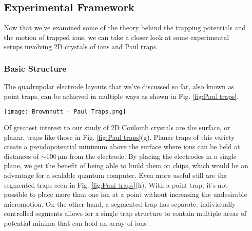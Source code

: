 \subsection{Experimental Framework}
Now that we've examined some of the theory behind the trapping potentials and the motion of trapped ions, we can take a closer look at some experimental setups involving 2D crystals of ions and Paul traps. 
\subsubsection{Basic Structure}
The quadrupolar electrode layouts that we've discussed so far, also known as point traps, can be achieved in multiple ways as shown in Fig. \ref{fig:Paul traps}.
\begin{figure*}[t]
    \centering
    \texttt{[image: Brownnutt - Paul Traps.png]}
    \caption{Several possible trap configurations are seen here. (\textbf{a}) In the simplist case, a set of four perfectly hyperbolic electrodes create a perfectly quadrupolar field. (\textbf{b}) This is a basic ring trap. It has rotational symmetry and an create a pseudopotential capable of confining ions in three dimensions. (\textbf{c}) This is translationally symmetric and forms the basis for a linear trap. (\textbf{d}), (\textbf{e}) These are both topologically equivalent to the ring trap in (b). (\textbf{f}) This is topologically equivalent to the linear trap in (c) but with additional endcap electrodes making it a four-rod linear trap. (\textbf{g}) The four-rod trap in (f) can be reconstructed so that the electrodes are flattened into a single plane. This forms a linear "surface-electrode" trap. (\textbf{h}) A linear trap similar to (g) except the electrodes have been segmented to allow for multiple trapping zones. Figure borrowed from \textit{Ion-trap measurements of electric-field noise near surfaces} \cite{Brownnutt}. Description is my own.}
    \label{fig:Paul traps}
\end{figure*}

Of greatest interest to our study of 2D Coulomb crystals are the surface, or planar, traps like those in Fig. \ref{fig:Paul traps}(g). Planar traps of this variety create a pseudopotential minimum above the surface where ions can be held at distances of $\sim \SI{100}{\micro\meter}$ from the electrode. By placing the electrodes in a single plane, we get the benefit of being able to build them on chips, which would be an advantage for a scalable quantum computer. Even more useful still are the segmented traps seen in Fig. \ref{fig:Paul traps}(h). With a point trap, it's not possible to place more than one ion at a point without increasing the undesirable micromotion. On the other hand, a segmented trap has separate, individually controlled segments allows for a single trap structure to contain multiple areas of potential minima that can hold an array of ions \cite{Brownnutt, Bruzewicz}. 

